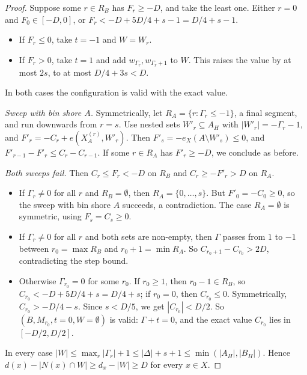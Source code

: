 \documentclass[11pt]{article}
\theoremstyle{definition}
\begin{document}
\begin{proof}
Suppose some $r\in R_B$ has $F_r\ge-D$, and take the least one. Either $r=0$ and $F_0\in[-D,0]$, or $F_r<-D+5D/4+s-1=D/4+s-1$.
\begin{itemize}[nosep]
\item If $F_r\le0$, take $t=-1$ and $W=W_r$.
\item If $F_r>0$, take $t=1$ and add $w_{\Gamma_r},w_{\Gamma_r+1}$ to $W$. This raises the value by at most $2s$, to at most $D/4+3s<D$.
\end{itemize}
In both cases the configuration is valid with the exact value.

\emph{Sweep with bin shore $A$.} Symmetrically, let $R_A=\{r:\Gamma_r\le-1\}$, a final segment, and run downwards from $r=s$. Use nested sets $W'_r\subseteq A_H$ with $|W'_r|=-\Gamma_r-1$, and $F'_r=-C_r+e(X_A^{(r)},W'_r)$. Then $F'_s=-e_X(A\setminus W'_s)\le0$, and $F'_{r-1}-F'_r\le C_r-C_{r-1}$. If some $r\in R_A$ has $F'_r\ge-D$, we conclude as before.

\emph{Both sweeps fail.} Then $C_r\le F_r<-D$ on $R_B$ and $C_r\ge-F'_r>D$ on $R_A$.
\begin{itemize}[nosep]
\item If $\Gamma_r\ne0$ for all $r$ and $R_B=\emptyset$, then $R_A=\{0,\dots,s\}$. But $F'_0=-C_0\ge0$, so the sweep with bin shore $A$ succeeds, a contradiction. The case $R_A=\emptyset$ is symmetric, using $F_s=C_s\ge0$.
\item If $\Gamma_r\ne0$ for all $r$ and both sets are non-empty, then $\Gamma$ passes from $1$ to $-1$ between $r_0=\max R_B$ and $r_0+1=\min R_A$. So $C_{r_0+1}-C_{r_0}>2D$, contradicting the step bound.
\item Otherwise $\Gamma_{r_0}=0$ for some $r_0$. If $r_0\ge1$, then $r_0-1\in R_B$, so $C_{r_0}<-D+5D/4+s=D/4+s$; if $r_0=0$, then $C_{r_0}\le0$. Symmetrically, $C_{r_0}>-D/4-s$. Since $s<D/5$, we get $|C_{r_0}|<D/2$. So $(B,M_{r_0},t=0,W=\emptyset)$ is valid: $\Gamma+t=0$, and the exact value $C_{r_0}$ lies in $[-D/2,D/2]$.
\end{itemize}

In every case $|W|\le\max_r|\Gamma_r|+1\le|\Delta|+s+1\le\min(|A_H|,|B_H|)$. Hence $d(x)-|N(x)\cap W|\ge d_x-|W|\ge D$ for every $x\in X$.
\end{proof}
\end{document}
